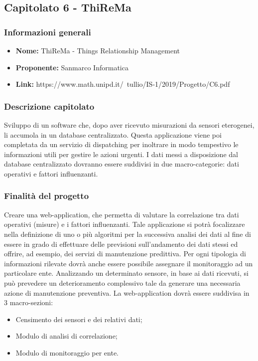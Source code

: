 \subsection{Capitolato 6 - ThiReMa}

	\subsubsection{Informazioni generali}
		\begin{itemize}
			\item \textbf{Nome:} ThiReMa - Things Relationship Management
			\item \textbf{Proponente:} Sanmarco Informatica
			\item \textbf{Link:} https://www.math.unipd.it/~tullio/IS-1/2019/Progetto/C6.pdf
		\end{itemize}

	\subsubsection{Descrizione capitolato}
		Sviluppo di un software che,  dopo aver ricevuto misurazioni da sensori eterogenei, li accumola in un database centralizzato. Questa applicazione viene poi completata da un servizio di dispatching per inoltrare in modo tempestivo le informazioni utili per gestire le azioni urgenti.
		I dati messi a disposizione dal database centralizzato dovranno essere suddivisi in due macro-categorie: dati operativi e fattori influenzanti.

	\subsubsection{Finalità del progetto}
		Creare una web-application, che permetta di valutare la correlazione tra dati operativi (misure) e i fattori influenzanti. Tale applicazione si potrà focalizzare nella definizione di uno o più algoritmi per la successiva analisi dei dati al fine di essere in grado di effettuare delle previsioni sull’andamento dei dati stessi ed offrire, ad esempio, dei servizi di manutenzione predittiva.
		Per ogni tipologia di informazioni rilevate dovrà anche essere possibile assegnare il monitoraggio ad un particolare ente. 
		Analizzando un determinato sensore, in base ai dati ricevuti, si può prevedere un deterioramento complessivo tale da generare una necessaria azione di manutenzione preventiva.
		La web-application dovrà essere suddivisa in 3 macro-sezioni:
			\begin{itemize}
				\item Censimento dei sensori e dei relativi dati;
				\item Modulo di analisi di correlazione;
				\item Modulo di monitoraggio per ente.
			\end{itemize}
		
